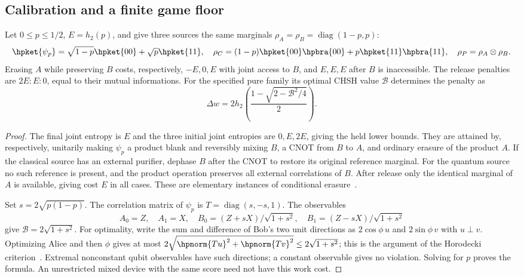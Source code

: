 \subsection{Calibration and a finite game floor}\label{hp:sec:calibration}
\begin{proposition}\label{hp:prop:calibration}
Let $0\le p\le1/2$, $E=h_2(p)$, and give three sources the same marginals $\rho_A=\rho_B=\operatorname{diag}(1-p,p)$:
\[
 \hpket{\psi_p}=\sqrt{1-p}\hpket{00}+\sqrt p\hpket{11},\quad
 \rho_C=(1-p)\hpket{00}\hpbra{00}+p\hpket{11}\hpbra{11},\quad
 \rho_P=\rho_A\otimes\rho_B.
\]
Erasing $A$ while preserving $B$ costs, respectively, $-E,0,E$ with joint access to $B$, and $E,E,E$ after $B$ is inaccessible. The release penalties are $2E:E:0$, equal to their mutual informations. For the specified pure family its optimal CHSH value $\mathcal B$ determines the penalty as
\[
 \Delta w=2h_2\left(\frac{1-\sqrt{2-\mathcal B^2/4}}2\right).
\]
\end{proposition}
\begin{proof}
The final joint entropy is $E$ and the three initial joint entropies are $0,E,2E$, giving the held lower bounds. They are attained by, respectively, unitarily making $\psi_p$ a product blank and reversibly mixing $B$, a CNOT from $B$ to $A$, and ordinary erasure of the product $A$. If the classical source has an external purifier, dephase $B$ after the CNOT to restore its original reference marginal. For the quantum source no such reference is present, and the product operation preserves all external correlations of $B$. After release only the identical marginal of $A$ is available, giving cost $E$ in all cases. These are elementary instances of conditional erasure~\cite{delRio11}.

Set $s=2\sqrt{p(1-p)}$. The correlation matrix of $\psi_p$ is $T=\operatorname{diag}(s,-s,1)$. The observables
\[
 A_0=Z,\quad A_1=X,\quad
 B_0=(Z+sX)/\sqrt{1+s^2},\quad B_1=(Z-sX)/\sqrt{1+s^2}
\]
give $\mathcal B=2\sqrt{1+s^2}$. For optimality, write the sum and difference of Bob's two unit directions as $2\cos\phi\,u$ and $2\sin\phi\,v$ with $u\perp v$. Optimizing Alice and then $\phi$ gives at most $2\sqrt{\hpnorm{Tu}^2+\hpnorm{Tv}^2}\le2\sqrt{1+s^2}$; this is the argument of the Horodecki criterion~\cite{HPhorodeckichsh}. Extremal nonconstant qubit observables have such directions; a constant observable gives no violation. Solving for $p$ proves the formula. An unrestricted mixed device with the same score need not have this work cost.
\end{proof}

